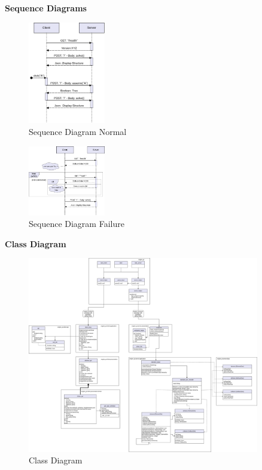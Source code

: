 \documentclass[12pt,a4paper]{article}
\newcommand{\<}[1]{\guilsinglleft}
\renewcommand{\>}[1]{\guilsinglright}
\begin{document}
\newpage

\noindent \textbf{Sequence Diagrams}

\begin{figure}[ht]
    \begin{center}
    \includegraphics[width=0.3\textwidth]{imgs/pt-v2-sequence-normal.png}
    \caption{Sequence Diagram Normal}
    \label{fig:pt-v2-sequence-normal}
    \end{center}
\end{figure}


\begin{figure}[ht]
    \begin{center}
    \includegraphics[width=0.3\textwidth]{imgs/pt-v2-sequence-failure.png}
    \caption{Sequence Diagram Failure}
    \label{fig:pt-v2-sequence-failure}
    \end{center}
\end{figure}

\newpage

\noindent \textbf{Class Diagram}

\begin{figure}[ht]
    \begin{center}
    \includegraphics[width=0.9\textwidth]{imgs/pt-v2-class-diag.png}
    \caption{Class Diagram}
    \label{fig:pt-v2-class-diag}
    \end{center}
\end{figure}
\end{document}
